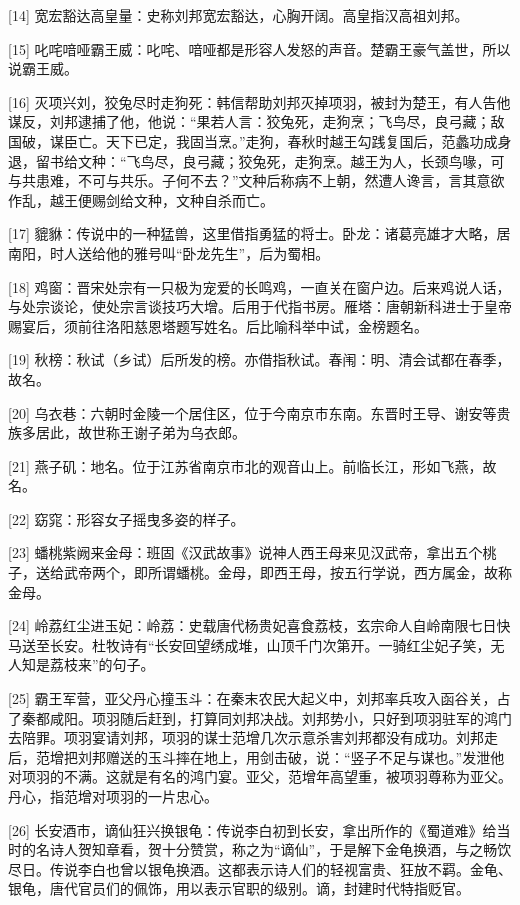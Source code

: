 \documentclass[12pt,UTF8]{ctexbook}
\begin{document}
[14] 宽宏豁达高皇量：史称刘邦宽宏豁达，心胸开阔。高皇指汉高祖刘邦。

[15] 叱咤喑哑霸王威：叱咤、喑哑都是形容人发怒的声音。楚霸王豪气盖世，所以说霸王威。

[16] 灭项兴刘，狡兔尽时走狗死：韩信帮助刘邦灭掉项羽，被封为楚王，有人告他谋反，刘邦逮捕了他，他说：“果若人言：狡兔死，走狗烹；飞鸟尽，良弓藏；敌国破，谋臣亡。天下已定，我固当烹。”走狗，春秋时越王勾践复国后，范蠡功成身退，留书给文种：“飞鸟尽，良弓藏；狡兔死，走狗烹。越王为人，长颈鸟喙，可与共患难，不可与共乐。子何不去？”文种后称病不上朝，然遭人谗言，言其意欲作乱，越王便赐剑给文种，文种自杀而亡。

[17] 貔貅：传说中的一种猛兽，这里借指勇猛的将士。卧龙：诸葛亮雄才大略，居南阳，时人送给他的雅号叫“卧龙先生”，后为蜀相。

[18] 鸡窗：晋宋处宗有一只极为宠爱的长鸣鸡，一直关在窗户边。后来鸡说人话，与处宗谈论，使处宗言谈技巧大增。后用于代指书房。雁塔：唐朝新科进士于皇帝赐宴后，须前往洛阳慈恩塔题写姓名。后比喻科举中试，金榜题名。

[19] 秋榜：秋试（乡试）后所发的榜。亦借指秋试。春闱：明、清会试都在春季，故名。

[20] 乌衣巷：六朝时金陵一个居住区，位于今南京市东南。东晋时王导、谢安等贵族多居此，故世称王谢子弟为乌衣郎。

[21] 燕子矶：地名。位于江苏省南京市北的观音山上。前临长江，形如飞燕，故名。

[22] 窈窕：形容女子摇曳多姿的样子。

[23] 蟠桃紫阙来金母：班固《汉武故事》说神人西王母来见汉武帝，拿出五个桃子，送给武帝两个，即所谓蟠桃。金母，即西王母，按五行学说，西方属金，故称金母。

[24] 岭荔红尘进玉妃：岭荔：史载唐代杨贵妃喜食荔枝，玄宗命人自岭南限七日快马送至长安。杜牧诗有“长安回望绣成堆，山顶千门次第开。一骑红尘妃子笑，无人知是荔枝来”的句子。

[25] 霸王军营，亚父丹心撞玉斗：在秦末农民大起义中，刘邦率兵攻入函谷关，占了秦都咸阳。项羽随后赶到，打算同刘邦决战。刘邦势小，只好到项羽驻军的鸿门去陪罪。项羽宴请刘邦，项羽的谋士范增几次示意杀害刘邦都没有成功。刘邦走后，范增把刘邦赠送的玉斗摔在地上，用剑击破，说：“竖子不足与谋也。”发泄他对项羽的不满。这就是有名的鸿门宴。亚父，范增年高望重，被项羽尊称为亚父。丹心，指范增对项羽的一片忠心。

[26] 长安酒市，谪仙狂兴换银龟：传说李白初到长安，拿出所作的《蜀道难》给当时的名诗人贺知章看，贺十分赞赏，称之为“谪仙”，于是解下金龟换酒，与之畅饮尽日。传说李白也曾以银龟换酒。这都表示诗人们的轻视富贵、狂放不羁。金龟、银龟，唐代官员们的佩饰，用以表示官职的级别。谪，封建时代特指贬官。
\end{document}

